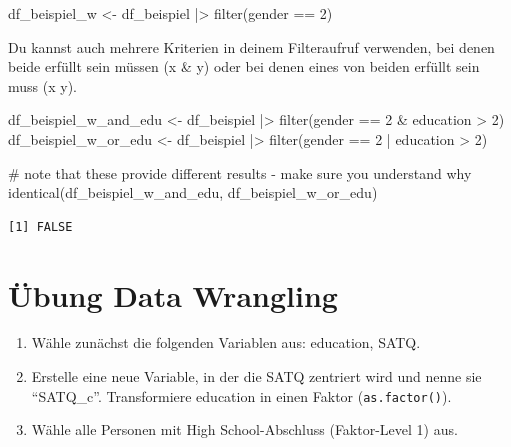 \documentclass[
  letterpaper,
  DIV=11,
  numbers=noendperiod]{scrreprt}
\newenvironment{Shaded}{\begin{snugshade}}{\end{snugshade}}
\newcommand{\CommentTok}[1]{\textcolor[rgb]{0.37,0.37,0.37}{#1}}
\newcommand{\DecValTok}[1]{\textcolor[rgb]{0.68,0.00,0.00}{#1}}
\newcommand{\FunctionTok}[1]{\textcolor[rgb]{0.28,0.35,0.67}{#1}}
\newcommand{\NormalTok}[1]{\textcolor[rgb]{0.00,0.23,0.31}{#1}}
\newcommand{\OtherTok}[1]{\textcolor[rgb]{0.00,0.23,0.31}{#1}}
\newcommand{\SpecialCharTok}[1]{\textcolor[rgb]{0.37,0.37,0.37}{#1}}
\providecommand{\tightlist}{%
  \setlength{\itemsep}{0pt}\setlength{\parskip}{0pt}}\usepackage{longtable,booktabs,array}
\begin{document}
\begin{Shaded}
\begin{Highlighting}[]
\NormalTok{df\_beispiel\_w }\OtherTok{\textless{}{-}}\NormalTok{ df\_beispiel }\SpecialCharTok{|\textgreater{}} \FunctionTok{filter}\NormalTok{(gender }\SpecialCharTok{==} \DecValTok{2}\NormalTok{)}
\end{Highlighting}
\end{Shaded}

Du kannst auch mehrere Kriterien in deinem Filteraufruf verwenden, bei
denen beide erfüllt sein müssen (x \& y) oder bei denen eines von beiden
erfüllt sein muss (x \textbar{} y).

\begin{Shaded}
\begin{Highlighting}[]
\NormalTok{df\_beispiel\_w\_and\_edu }\OtherTok{\textless{}{-}}\NormalTok{ df\_beispiel }\SpecialCharTok{|\textgreater{}} \FunctionTok{filter}\NormalTok{(gender }\SpecialCharTok{==} \DecValTok{2} \SpecialCharTok{\&}\NormalTok{ education }\SpecialCharTok{\textgreater{}} \DecValTok{2}\NormalTok{)}
\NormalTok{df\_beispiel\_w\_or\_edu }\OtherTok{\textless{}{-}}\NormalTok{ df\_beispiel }\SpecialCharTok{|\textgreater{}} \FunctionTok{filter}\NormalTok{(gender }\SpecialCharTok{==} \DecValTok{2} \SpecialCharTok{|}\NormalTok{ education }\SpecialCharTok{\textgreater{}} \DecValTok{2}\NormalTok{)}


\CommentTok{\# note that these provide different results {-} make sure you understand why}
\FunctionTok{identical}\NormalTok{(df\_beispiel\_w\_and\_edu, df\_beispiel\_w\_or\_edu)}
\end{Highlighting}
\end{Shaded}

\begin{verbatim}
[1] FALSE
\end{verbatim}

\section{Übung Data Wrangling}\label{uxfcbung-data-wrangling}

\begin{enumerate}
\def\labelenumi{\arabic{enumi})}
\tightlist
\item
  Wähle zunächst die folgenden Variablen aus: education, SATQ.
\item
  Erstelle eine neue Variable, in der die SATQ zentriert wird und nenne
  sie ``SATQ\_c''. Transformiere education in einen Faktor
  (\texttt{as.factor()}).
\item
  Wähle alle Personen mit High School-Abschluss (Faktor-Level 1) aus.
\end{enumerate}
\end{document}
